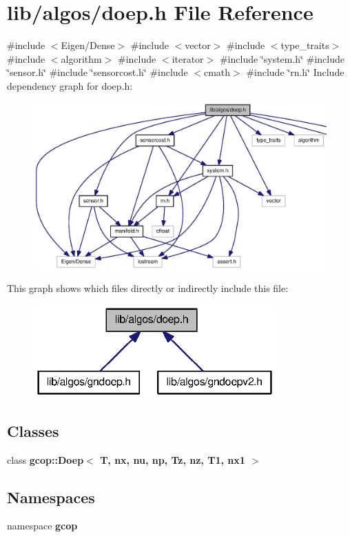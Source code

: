 \section{lib/algos/doep.h \-File \-Reference}
\label{doep_8h}
{\ttfamily \#include $<$\-Eigen/\-Dense$>$}\*
{\ttfamily \#include $<$vector$>$}\*
{\ttfamily \#include $<$type\-\_\-traits$>$}\*
{\ttfamily \#include $<$algorithm$>$}\*
{\ttfamily \#include $<$iterator$>$}\*
{\ttfamily \#include \char`\"{}system.\-h\char`\"{}}\*
{\ttfamily \#include \char`\"{}sensor.\-h\char`\"{}}\*
{\ttfamily \#include \char`\"{}sensorcost.\-h\char`\"{}}\*
{\ttfamily \#include $<$cmath$>$}\*
{\ttfamily \#include \char`\"{}rn.\-h\char`\"{}}\*
\-Include dependency graph for doep.\-h\-:\nopagebreak
\begin{figure}[H]
\begin{center}
\leavevmode
\includegraphics[width=350pt]{doep_8h__incl}
\end{center}
\end{figure}
\-This graph shows which files directly or indirectly include this file\-:\nopagebreak
\begin{figure}[H]
\begin{center}
\leavevmode
\includegraphics[width=262pt]{doep_8h__dep__incl}
\end{center}
\end{figure}
\subsection*{\-Classes}
\begin{DoxyCompactItemize}
\item 
class {\bf gcop\-::\-Doep$<$ T, nx, nu, np, Tz, nz, T1, nx1 $>$}
\end{DoxyCompactItemize}
\subsection*{\-Namespaces}
\begin{DoxyCompactItemize}
\item 
namespace {\bf gcop}
\end{DoxyCompactItemize}
